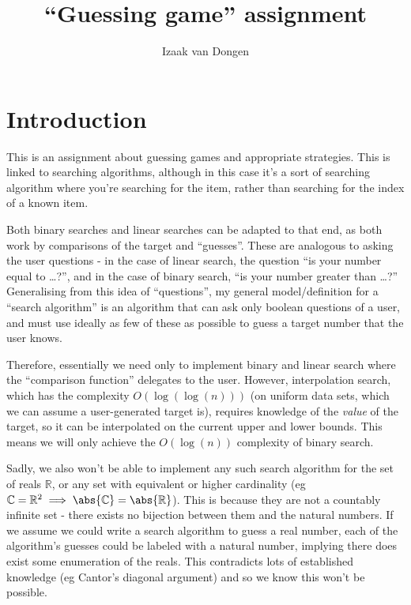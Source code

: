 \documentclass[fleqn,a4paper,11pt]{article}
\title{``Guessing game'' assignment}
\author{Izaak van Dongen}
\begin{document}
    \maketitle
    \tableofcontents
    \lstlistoflistings
    \listoffigures

    \section{Introduction}

    This is an assignment about guessing games and appropriate strategies. This
    is linked to searching algorithms, although in this case it's a sort of
    searching algorithm where you're searching for the item, rather than
    searching for the index of a known item.

    Both binary searches and linear searches can be adapted to that end, as both
    work by comparisons of the target and ``guesses''. These are analogous to
    asking the user questions - in the case of linear search, the question ``is
    your number equal to \ldots?'', and in the case of binary search, ``is your
    number greater than \ldots?'' Generalising from this idea of ``questions'',
    my general model/definition for a ``search algorithm'' is an algorithm that
    can ask only boolean questions of a user, and must use ideally as few of
    these as possible to guess a target number that the user knows.

    Therefore, essentially we need only to implement binary and linear search
    where the ``comparison function'' delegates to the user.  However,
    interpolation search, which has the complexity $O(\log(\log(n)))$ (on
    uniform data sets, which we can assume a user-generated target is), requires
    knowledge of the \emph{value} of the target, so it can be interpolated on
    the current upper and lower bounds. This means we will only achieve the
    $O(\log(n))$ complexity of binary search.

    Sadly, we also won't be able to implement any such search algorithm for the
    set of reals $\mathbb{R}$, or any set with equivalent or higher cardinality
    (eg $\mathbb{C} = \mathbb{R}^2 \implies \abs{\mathbb{C}} =
    \abs{\mathbb{R}}$). This is because they are not a countably infinite set -
    there exists no bijection between them and the natural numbers. If we assume
    we could write a search algorithm to guess a real number, each of the
    algorithm's guesses could be labeled with a natural number, implying there
    does exist some enumeration of the reals. This contradicts lots of
    established knowledge (eg Cantor's diagonal argument) and so we know this
    won't be possible.
\end{document}
